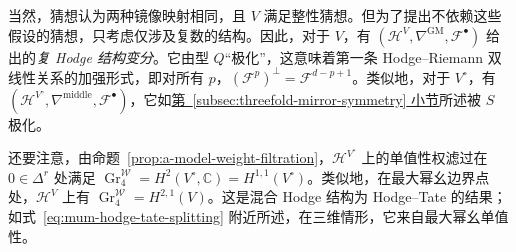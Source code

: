 当然，猜想认为两种镜像映射相同，且 $V$ 满足整性猜想。但为了提出不依赖这些假设的猜想，只考虑仅涉及复数的结构。因此，对于 $V$，有 $(\mathcal H^V,\nabla^{\mathrm{GM}},\mathcal F^\bullet)$ 给出的\emph{复 Hodge 结构变分}。它由型 $Q$“极化”，这意味着第一条 Hodge--Riemann 双线性关系的加强形式，即对所有 $p$，$(\mathcal F^p)^\perp=\mathcal F^{d-p+1}$。类似地，对于 $V^\circ$，有 $(\mathcal H^{V^\circ},\nabla^{\mathrm{middle}},\mathcal F^\bullet)$，它如\hyperref[subsec:threefold-mirror-symmetry]{第~\ref*{subsec:threefold-mirror-symmetry} 小节}所述被 $S$ 极化。

还要注意，由命题~\ref{prop:a-model-weight-filtration}，$\mathcal H^{V^\circ}$ 上的单值性权滤过在 $0\in\Delta^r$ 处满足 $\operatorname{Gr}^{\mathcal W}_4=H^2(V^\circ,\mathbb C)=H^{1,1}(V^\circ)$。类似地，在最大幂幺边界点处，$\mathcal H^V$ 上有 $\operatorname{Gr}^{\mathcal W}_4=H^{2,1}(V)$。这是混合 Hodge 结构为 Hodge--Tate 的结果；如式~\eqref{eq:mum-hodge-tate-splitting} 附近所述，在三维情形，它来自最大幂幺单值性。

